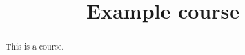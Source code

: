 \documentclass{xourse}
\title{Example course}
\begin{document}
\begin{abstract}
  This is a course.
\end{abstract}
\maketitle


\end{document}
